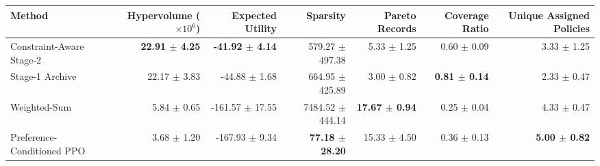 \begin{tabular}{@{}lrrrrrr@{}}
\toprule
Method & Hypervolume ($\times 10^6$) & Expected Utility & Sparsity & Pareto Records & Coverage Ratio & Unique Assigned Policies \\
\midrule
Constraint-Aware Stage-2 & \textbf{22.91 $\pm$ 4.25} & \textbf{-41.92 $\pm$ 4.14} & 579.27 $\pm$ 497.38 & 5.33 $\pm$ 1.25 & 0.60 $\pm$ 0.09 & 3.33 $\pm$ 1.25 \\
Stage-1 Archive & 22.17 $\pm$ 3.83 & -44.88 $\pm$ 1.68 & 664.95 $\pm$ 425.89 & 3.00 $\pm$ 0.82 & \textbf{0.81 $\pm$ 0.14} & 2.33 $\pm$ 0.47 \\
Weighted-Sum & 5.84 $\pm$ 0.65 & -161.57 $\pm$ 17.55 & 7484.52 $\pm$ 444.14 & \textbf{17.67 $\pm$ 0.94} & 0.25 $\pm$ 0.04 & 4.33 $\pm$ 0.47 \\
Preference-Conditioned PPO & 3.68 $\pm$ 1.20 & -167.93 $\pm$ 9.34 & \textbf{77.18 $\pm$ 28.20} & 15.33 $\pm$ 4.50 & 0.36 $\pm$ 0.13 & \textbf{5.00 $\pm$ 0.82} \\
\bottomrule
\end{tabular}
